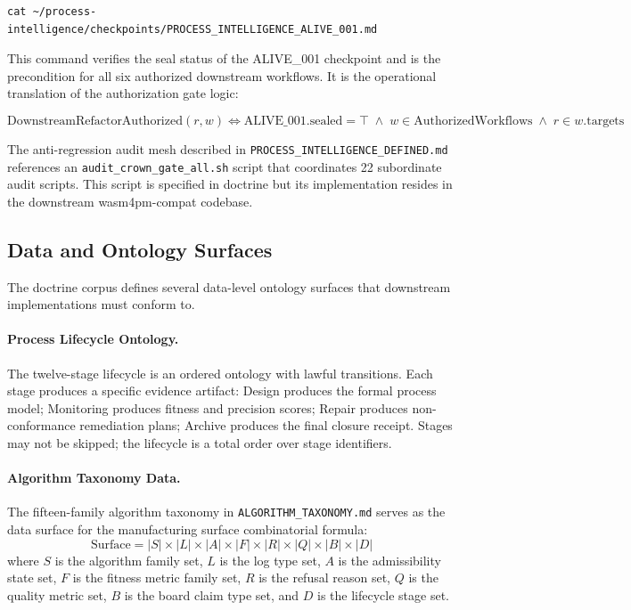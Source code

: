 \begin{verbatim}
cat ~/process-intelligence/checkpoints/PROCESS_INTELLIGENCE_ALIVE_001.md
\end{verbatim}

This command verifies the seal status of the ALIVE\_001 checkpoint and is the precondition
for all six authorized downstream workflows. It is the operational translation of the
authorization gate logic:

\[
  \text{DownstreamRefactorAuthorized}(r, w) \iff
  \text{ALIVE\_001.sealed} = \top \;\land\; w \in \text{AuthorizedWorkflows} \;\land\;
  r \in w.\text{targets}
\]

The anti-regression audit mesh described in \texttt{PROCESS\_INTELLIGENCE\_DEFINED.md}
references an \texttt{audit\_crown\_gate\_all.sh} script that coordinates 22 subordinate
audit scripts. This script is specified in doctrine but its implementation resides in the
downstream wasm4pm-compat codebase.

\subsection{Data and Ontology Surfaces}
\label{sec:doctrine-implementation-data}

The doctrine corpus defines several data-level ontology surfaces that downstream
implementations must conform to.

\paragraph{Process Lifecycle Ontology.} The twelve-stage lifecycle is an ordered ontology
with lawful transitions. Each stage produces a specific evidence artifact: Design produces
the formal process model; Monitoring produces fitness and precision scores; Repair produces
non-conformance remediation plans; Archive produces the final closure receipt. Stages may not
be skipped; the lifecycle is a total order over stage identifiers.

\paragraph{Algorithm Taxonomy Data.} The fifteen-family algorithm taxonomy in
\texttt{ALGORITHM\_TAXONOMY.md} serves as the data surface for the manufacturing surface
combinatorial formula:
\[
  \text{Surface} = |S| \times |L| \times |A| \times |F| \times |R| \times |Q| \times |B| \times |D|
\]
where $S$ is the algorithm family set, $L$ is the log type set, $A$ is the admissibility
state set, $F$ is the fitness metric family set, $R$ is the refusal reason set, $Q$ is the
quality metric set, $B$ is the board claim type set, and $D$ is the lifecycle stage set.

